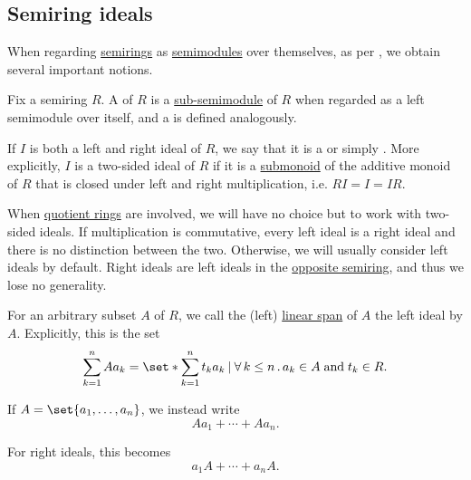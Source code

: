 \subsection{Semiring ideals}\label{subsec:semiring_ideals}

When regarding \hyperref[def:semiring]{semirings} as \hyperref[def:semimodule]{semimodules} over themselves, as per , we obtain several important notions.

\begin{definition}\label{def:semiring_ideal}\mimprovised
  Fix a semiring \( R \). A  of \( R \) is a \hyperref[def:semimodule/submodel]{sub-semimodule} of \( R \) when regarded as a left semimodule over itself, and a  is defined analogously.

  If \( I \) is both a left and right ideal of \( R \), we say that it is a  or simply . More explicitly, \( I \) is a two-sided ideal of \( R \) if it is a \hyperref[def:monoid/submodel]{submonoid} of the additive monoid of \( R \) that is closed under left and right multiplication, i.e. \( RI = I = IR \).

  When \hyperref[def:ring/quotient]{quotient rings} are involved, we will have no choice but to work with two-sided ideals. If multiplication is commutative, every left ideal is a right ideal and there is no distinction between the two. Otherwise, we will usually consider left ideals by default. Right ideals are left ideals in the \hyperref[def:semiring/opposite]{opposite semiring}, and thus we lose no generality.

  \begin{thmenum}
     For an arbitrary subset \( A \) of \( R \), we call the (left) \hyperref[def:semimodule/submodel]{linear span} of \( A \) the left ideal  by \( A \). Explicitly, this is the set
    \begin{equation*}
      \sum_{k=1}^n A a_k = \set*{ \sum_{k=1}^n t_k a_k \given \qforall {k \leq n} a_k \in A \T{and} t_k \in R }.
    \end{equation*}

    If \( A = \set{ a_1, \ldots, a_n } \), we instead write
    \begin{equation*}
      A a_1 + \cdots + A a_n.
    \end{equation*}

    For right ideals, this becomes
    \begin{equation*}
      a_1 A + \cdots + a_n A.
    \end{equation*}


\end{thmenum}
\end{definition}
